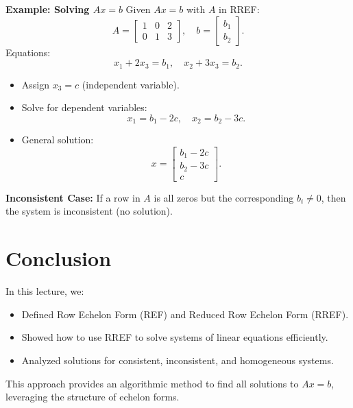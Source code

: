 \documentclass{article}
\begin{document}
\textbf{Example: Solving $Ax = b$}
Given $Ax = b$ with $A$ in RREF:
\[
  A =
  \begin{bmatrix}
    1 & 0 & 2 \\
    0 & 1 & 3
  \end{bmatrix},
  \quad
  b =
  \begin{bmatrix}
    b_1 \\
    b_2
  \end{bmatrix}.
\]
Equations:
\[
  x_1 + 2x_3 = b_1, \quad x_2 + 3x_3 = b_2.
\]
\begin{itemize}
  \item Assign $x_3 = c$ (independent variable).
  \item Solve for dependent variables:
    \[
      x_1 = b_1 - 2c, \quad x_2 = b_2 - 3c.
    \]
  \item General solution:
    \[
      x =
      \begin{bmatrix}
        b_1 - 2c \\
        b_2 - 3c \\
        c
      \end{bmatrix}.
    \]
\end{itemize}

\textbf{Inconsistent Case:}
If a row in $A$ is all zeros but the corresponding $b_i \neq 0$, then the system is inconsistent (no solution).

\section*{Conclusion}

In this lecture, we:
\begin{itemize}
  \item Defined Row Echelon Form (REF) and Reduced Row Echelon Form (RREF).
  \item Showed how to use RREF to solve systems of linear equations efficiently.
  \item Analyzed solutions for consistent, inconsistent, and homogeneous systems.
\end{itemize}

This approach provides an algorithmic method to find all solutions to $Ax = b$, leveraging the structure of echelon forms.
\end{document}
